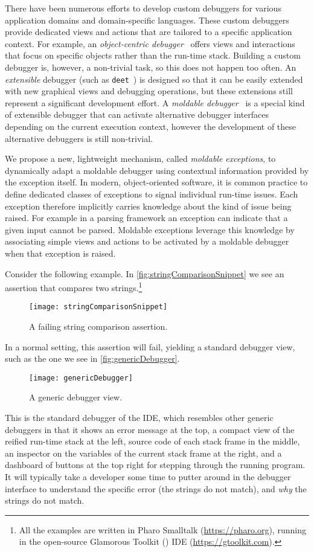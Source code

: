 \documentclass[sigplan,screen]{acmart} %
\newcommand{\GT}{\lst{GT}\xspace} %
\newcommand\deet{{\tt deet}\xspace}
\begin{document}
There have been numerous efforts to develop custom debuggers for various application domains and domain-specific languages.
These custom debuggers provide dedicated views and actions that are tailored to a specific application context.
For example, an \emph{object-centric debugger}~\cite{Ress12a} offers views and interactions that focus on specific objects rather than the run-time stack.
Building a custom debugger is, however, a non-trivial task, so this does not happen too often.
An \emph{extensible} debugger (such as \deet~\cite{Hans97a}) is designed so that it can be easily extended with new graphical views and debugging operations, but these extensions still represent a significant development effort.
A \emph{moldable debugger}~\cite{Chis15c} is a special kind of extensible debugger that can activate alternative debugger interfaces depending on the current execution context, however the development of these alternative debuggers is still non-trivial.

We propose a new, lightweight mechanism, called \emph{moldable exceptions}, to dynamically adapt a moldable debugger using contextual information provided by the exception itself.
In modern, object-oriented software, it is common practice to define dedicated classes of exceptions to signal individual run-time issues.
Each exception therefore implicitly carries knowledge about the kind of issue being raised.
For example in a parsing framework an exception can indicate that a given input cannot be parsed.
Moldable exceptions leverage this knowledge by associating simple views and actions to be activated by a moldable debugger when that exception is raised.

Consider the following example.
In \autoref{fig:stringComparisonSnippet} we see an assertion that compares two strings.\footnote{All the examples are written in Pharo Smalltalk (\url{https://pharo.org}), running in the open-source Glamorous Toolkit (\GT) IDE (\url{https://gtoolkit.com}).}
\begin{figure}[h]
  \texttt{[image: stringComparisonSnippet]}
  \caption{A failing string comparison assertion.}
  \label{fig:stringComparisonSnippet}
\end{figure}
In a normal setting, this assertion will fail, yielding a standard debugger view, such as the one we see in \autoref{fig:genericDebugger}.
\begin{figure}[h]
  \texttt{[image: genericDebugger]}
  \caption{A generic debugger view.}
  \label{fig:genericDebugger}
\end{figure}
This is the standard debugger of the \GT IDE, which resembles other generic debuggers in that it shows an error message at the top, a compact view of the reified run-time stack at the left, source code of each stack frame in the middle, an inspector on the variables of the current stack frame at the right, and a dashboard of buttons at the top right for stepping through the running program.
It will typically take a developer some time to putter around in the debugger interface to understand the specific error (the strings do not match), and \emph{why} the strings do not match.
\end{document}

